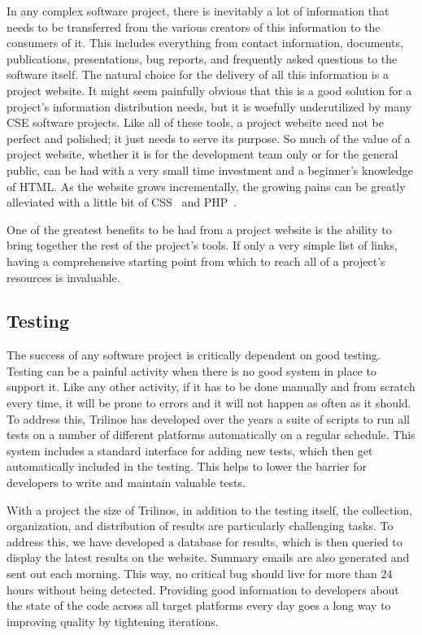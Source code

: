 \documentclass[times,10pt,twocolumn]{article}
\begin{document}
In any complex software project, there is inevitably a lot of
information that needs to be transferred from the various creators
of this information to the consumers of it.  This includes
everything from contact information, documents, publications,
presentations, bug reports, and frequently asked questions to the
software itself.  The natural choice for the delivery of all this
information is a project website.  It might seem painfully obvious
that this is a good solution for a project's information
distribution needs, but it is woefully underutilized by many CSE
software projects.  Like all of these tools, a project website need
not be perfect and polished; it just needs to serve its purpose.  So
much of the value of a project website, whether it is for the
development team only or for the general public, can be had with a
very small time investment and a beginner's knowledge of HTML.  As
the website grows incrementally, the growing pains can be greatly
alleviated with a little bit of CSS~\cite{CSS} and PHP~\cite{PHP}.

One of the greatest benefits to be had from a project website is the
ability to bring together the rest of the project's tools.  If only
a very simple list of links, having a comprehensive starting point
from which to reach all of a project's resources is invaluable.

\subsection{Testing}


The success of any software project is critically dependent on good
testing. Testing can be a painful activity when there is no good
system in place to support it.  Like any other activity, if it has
to be done manually and from scratch every time, it will be prone to
errors and it will not happen as often as it should.  To address
this, Trilinos has developed over the years a suite of scripts to
run all tests on a number of different platforms automatically on a
regular schedule.  This system includes a standard interface for
adding new tests, which then get automatically included in the
testing.  This helps to lower the barrier for developers to write
and maintain valuable tests.

With a project the size of Trilinos, in addition to the testing
itself, the collection, organization, and distribution of results
are particularly challenging tasks.  To address this, we have
developed a database for results, which is then queried to display
the latest results on the website.  Summary emails are also
generated and sent out each morning.  This way, no critical bug
should live for more than 24 hours without being detected. Providing
good information to developers about the state of the code across
all target platforms every day goes a long way to improving quality
by tightening iterations.
\end{document}
